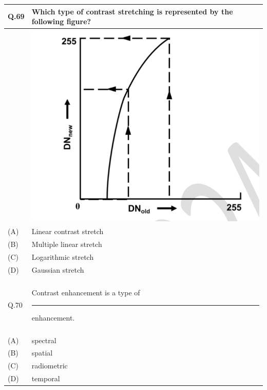 \documentclass[12pt]{article}
\begin{document}
\begin{table}[H]
\renewcommand{\arraystretch}{3}
\setlength{\tabcolsep}{8pt}
\begin{tabular}{|l|p{15cm}|}
\hline
 
Q.69&Which type of contrast stretching is represented by the following figure?\\ \hline 
& \includegraphics[scale = 0.6]{LatexImage8.png} \\ \hline
(A)&Linear contrast stretch\\ \hline
(B)&Multiple linear stretch\\ \hline
(C)&Logarithmic stretch\\ \hline
(D)&Gaussian stretch\\ \hline
 & \\ \hline

Q.70 &Contrast enhancement is a type of \rule{2cm}{0.15mm} enhancement.\\ \hline
 & \\ \hline
(A)&spectral\\ \hline
(B)&spatial\\ \hline
(C)&radiometric\\ \hline
(D)&temporal\\ \hline

\end{tabular}
\end{table}
 \newpage
\end{document}
